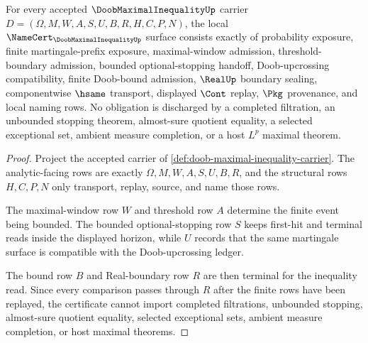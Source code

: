 \begin{theorem}
\label{thm:doob-maximal-inequality-namecert-obligations}
For every accepted $\DoobMaximalInequalityUp$ carrier $D=(\Omega,M,W,A,S,U,B,R,H,C,P,N)$, the local $\NameCert_{\DoobMaximalInequalityUp}$ surface consists exactly of probability exposure, finite martingale-prefix exposure, maximal-window admission, threshold-boundary admission, bounded optional-stopping handoff, Doob-upcrossing compatibility, finite Doob-bound admission, $\RealUp$ boundary sealing, componentwise $\hsame$ transport, displayed $\Cont$ replay, $\Pkg$ provenance, and local naming rows. No obligation is discharged by a completed filtration, an unbounded stopping theorem, almost-sure quotient equality, a selected exceptional set, ambient measure completion, or a host $L^p$ maximal theorem.
\end{theorem}
\begin{proof}
Project the accepted carrier of \autoref{def:doob-maximal-inequality-carrier}. The analytic-facing rows are exactly $\Omega,M,W,A,S,U,B,R$, and the structural rows $H,C,P,N$ only transport, replay, source, and name those rows.

The maximal-window row $W$ and threshold row $A$ determine the finite event being bounded. The bounded optional-stopping row $S$ keeps first-hit and terminal reads inside the displayed horizon, while $U$ records that the same martingale surface is compatible with the Doob-upcrossing ledger.

The bound row $B$ and Real-boundary row $R$ are then terminal for the inequality read. Since every comparison passes through $R$ after the finite rows have been replayed, the certificate cannot import completed filtrations, unbounded stopping, almost-sure quotient equality, selected exceptional sets, ambient measure completion, or host maximal theorems.
\end{proof}


